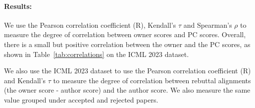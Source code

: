 \documentclass{article} %
\begin{document}
\paragraph{Results:}We use the Pearson correlation coefficient (R), Kendall's $\tau$ and Spearman's $\rho$ to measure the degree of correlation between owner scores and PC scores. Overall, there is a small but positive correlation between the owner and the PC scores, as shown in Table~\ref{tab:correlations} on the \textsc{ICML 2023} dataset.
\begin{table}[t]
\centering
\caption{Correlations between owner and program committee (PC) scores.}
\label{tab:correlations}

\begin{minipage}[t]{0.48\textwidth}
\centering
{}
\end{minipage}
\hfill
\begin{minipage}[t]{0.48\textwidth}
\centering
{}
\end{minipage}
\end{table}

We also use the \textsc{ICML 2023} dataset to use the Pearson correlation coefficient (R) and Kendall's $\tau$ to measure the degree of correlation between rebuttal alignments (the owner score - author score) and the author score. We also measure the same value grouped under accepted and rejected papers.
\end{document}
